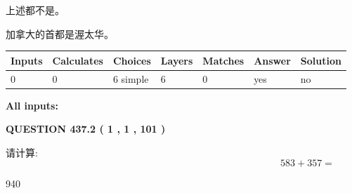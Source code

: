 \documentclass{ctexart}
\begin{document}
 
 上述都不是。
 
 
\noindent{}
 
 
加拿大的首都是渥太华。
 
 
\noindent{}
 
 
   
   
   
   
\noindent\begin{tabular}{|l|l|l|l|l|l|l|}
 \hline
Inputs & Calculates & Choices & Layers & Matches & Answer & Solution \\ \hline
 0  & 
 0  & 
 6
  simple  
  & 
 6  & 
 0  & 
  yes & 
  no 
  \\ \hline
 \end{tabular}
   
   
   
   
\noindent{}
   
   
   
   
\noindent\vspace{0.1in}\hspace{-0.08in} {\textbf{\Large{All inputs: }}}
   
   
  
\vspace{0.2in}
  
{\textbf{\Large{QUESTION
437.2 
 ( 1 , 1 , 101 )
}}}
  
  
 
请计算:
\begin{equation}
583 +  %
357 = \nonumber
\end{equation}
 
 
 
\noindent{}
 
 

940
 
 
\noindent{}
 
 

 
 
 
\noindent{}
 
 
\end{document}
